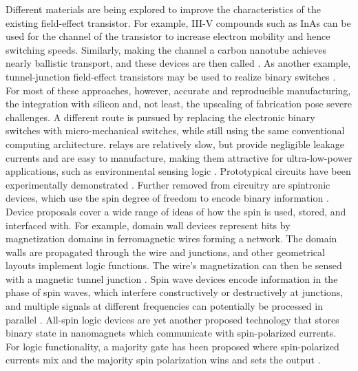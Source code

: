 Different materials are being explored to improve the characteristics of the
existing field-effect transistor. For example, III-V compounds such as InAs can
be used for the channel of the transistor to increase electron mobility and
hence switching speeds. Similarly, making the channel a carbon nanotube achieves
nearly ballistic transport, and these devices are then called .
As another example, tunnel-junction field-effect transistors may be used to
realize binary switches \cite{nikonov2013overview} \cite{cavin2012science}. For
most of these approaches, however, accurate and reproducible manufacturing, the
integration with silicon and, not least, the upscaling of fabrication pose
severe challenges. A different route is pursued by replacing the electronic
binary switches with micro-mechanical switches, while still using the same
conventional computing architecture.  relays are relatively slow, but
provide negligible leakage currents and are easy to manufacture, making them
attractive for ultra-low-power applications, such as environmental sensing logic
\cite{kam2011design}. Prototypical  circuits have been experimentally
demonstrated \cite{spencer2011demonstration}. Further removed from 
circuitry are spintronic devices, which use the spin degree of freedom to encode
binary information \cite{wolf2001spintronics}. Device proposals cover a wide
range of ideas of how the spin is used, stored, and interfaced with. For
example, domain wall devices represent bits by magnetization domains in
ferromagnetic wires forming a network. The domain walls are propagated through
the wire and junctions, and other geometrical layouts implement logic functions.
The wire's magnetization can then be sensed with a magnetic tunnel junction
\cite{allwood2005magnetic}. Spin wave devices encode information in the phase of
spin waves, which interfere constructively or destructively at junctions, and
multiple signals at different frequencies can potentially be processed in
parallel \cite{khitun2005nano} \cite{kostylev2005spin}. All-spin logic devices
are yet another proposed technology that stores binary state in nanomagnets
which communicate with spin-polarized currents. For logic functionality, a
majority gate has been proposed where spin-polarized currents mix and the
majority spin polarization wins and sets the output \cite{behin2010proposal}
\cite{srinivasan2011all}. 

